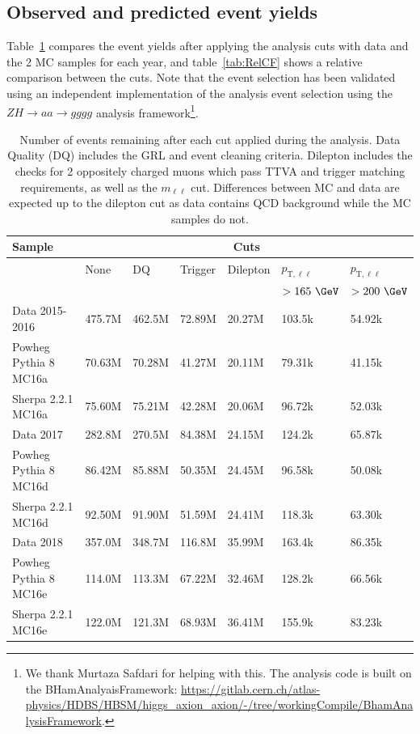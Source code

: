 
\subsection{Observed and predicted event yields}
\label{sec:cutflow}

Table~\ref{tab:CFComp} compares the event yields after applying the analysis cuts with data and the 2 MC samples for each year, and table~\ref{tab:RelCF} shows a relative comparison between the cuts.  Note that the event selection has been validated using an independent implementation of the analysis event selection using the $ZH\rightarrow aa\rightarrow gggg$ analysis framework\footnote{We thank Murtaza Safdari for helping with this.  The analysis code is built on the BHamAnalyaisFramework: \url{https://gitlab.cern.ch/atlas-physics/HDBS/HBSM/higgs_axion_axion/-/tree/workingCompile/BhamAnalysisFramework}.}.

\begin{table}[h!]
    \centering
    \begin{tabular}{l|l|l|l|l|l|l}
    \hline\hline
    \textbf{Sample} & \multicolumn{6}{c}{\textbf{Cuts}} \\ \hline
     & None & DQ & Trigger & Dilepton & $p_{\text{T},\ell\ell}$ & $p_{\text{T},\ell\ell}$ \\
     &  &  &  &  & $>165~\GeV$ & $>200~\GeV$ \\ \hline\hline
    Data 2015-2016 & 475.7M & 462.5M & 72.89M & 20.27M & 103.5k & 54.92k \\ \hline
    Powheg Pythia 8 MC16a & 70.63M & 70.28M & 41.27M & 20.11M & 79.31k & 41.15k \\ \hline
    Sherpa 2.2.1 MC16a & 75.60M & 75.21M & 42.28M & 20.06M & 96.72k & 52.03k \\ \hline\hline
    Data 2017 & 282.8M & 270.5M & 84.38M & 24.15M & 124.2k & 65.87k \\ \hline
    Powheg Pythia 8 MC16d & 86.42M & 85.88M & 50.35M & 24.45M & 96.58k & 50.08k \\ \hline
    Sherpa 2.2.1 MC16d & 92.50M & 91.90M & 51.59M & 24.41M & 118.3k & 63.30k \\ \hline\hline
    Data 2018 & 357.0M & 348.7M & 116.8M & 35.99M & 163.4k & 86.35k \\ \hline
    Powheg Pythia 8 MC16e & 114.0M & 113.3M & 67.22M & 32.46M & 128.2k & 66.56k \\ \hline
    Sherpa 2.2.1 MC16e & 122.0M & 121.3M & 68.93M & 36.41M & 155.9k & 83.23k \\ \hline\hline
    \end{tabular}
    \caption{Number of events remaining after each cut applied during the analysis. Data Quality (DQ) includes the GRL and event cleaning criteria.
    Dilepton includes the checks for 2 oppositely charged muons which pass TTVA and trigger matching requirements, as well as the $m_{\ell\ell}$ cut.
    Differences between MC and data are expected up to the dilepton cut as data contains QCD background while the MC samples do not.}
    \label{tab:CFComp}
\end{table}


